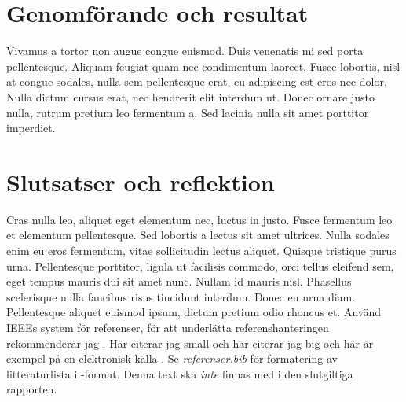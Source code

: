 \documentclass[a4,11pt]{report} %
\begin{document}
\section{Genomförande och resultat}
Vivamus a tortor non augue congue euismod. Duis venenatis mi sed porta pellentesque. Aliquam feugiat quam nec condimentum laoreet. Fusce lobortis, nisl at congue sodales, nulla sem pellentesque erat, eu adipiscing est eros nec dolor. Nulla dictum cursus erat, nec hendrerit elit interdum ut. Donec ornare justo nulla, rutrum pretium leo fermentum a. Sed lacinia nulla sit amet porttitor imperdiet.
\section{Slutsatser och reflektion}
Cras nulla leo, aliquet eget elementum nec, luctus in justo. Fusce fermentum leo et elementum pellentesque. Sed lobortis a lectus sit amet ultrices. Nulla sodales enim eu eros fermentum, vitae sollicitudin lectus aliquet. Quisque tristique purus urna. Pellentesque porttitor, ligula ut facilisis commodo, orci tellus eleifend sem, eget tempus mauris dui sit amet nunc. Nullam id mauris nisl. Phasellus scelerisque nulla faucibus risus tincidunt interdum. Donec eu urna diam. Pellentesque aliquet euismod ipsum, dictum pretium odio rhoncus et.
\newpage
Använd IEEEs system för referenser, för att underlätta referenshanteringen rekommenderar jag \BibTeX. Här citerar jag small \cite{small} och här citerar jag big \cite{big} och här är exempel på en elektronisk källa \cite{sven02}. Se \emph{referenser.bib} för formatering av litteraturlista i \BibTeX-format. Denna text ska \emph{inte} finnas med i den slutgiltiga rapporten.


\end{document}
